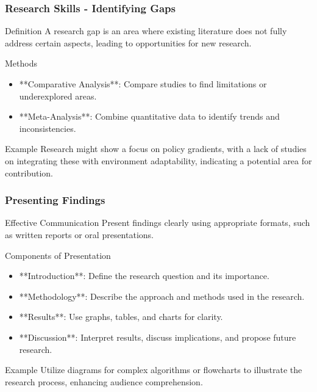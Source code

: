 \documentclass[aspectratio=169]{beamer}
\begin{document}
\begin{frame}[fragile]
    \frametitle{Research Skills - Identifying Gaps}
    \begin{block}{Definition}
        A research gap is an area where existing literature does not fully address certain aspects, leading to opportunities for new research.
    \end{block}
    \begin{block}{Methods}
        \begin{itemize}
            \item **Comparative Analysis**: Compare studies to find limitations or underexplored areas.
            \item **Meta-Analysis**: Combine quantitative data to identify trends and inconsistencies.
        \end{itemize}
    \end{block}
    \begin{block}{Example}
        Research might show a focus on policy gradients, with a lack of studies on integrating these with environment adaptability, indicating a potential area for contribution.
    \end{block}
\end{frame}

\begin{frame}[fragile]
    \frametitle{Presenting Findings}
    \begin{block}{Effective Communication}
        Present findings clearly using appropriate formats, such as written reports or oral presentations.
    \end{block}
    \begin{block}{Components of Presentation}
        \begin{itemize}
            \item **Introduction**: Define the research question and its importance.
            \item **Methodology**: Describe the approach and methods used in the research.
            \item **Results**: Use graphs, tables, and charts for clarity.
            \item **Discussion**: Interpret results, discuss implications, and propose future research.
        \end{itemize}
    \end{block}
    \begin{block}{Example}
        Utilize diagrams for complex algorithms or flowcharts to illustrate the research process, enhancing audience comprehension.
    \end{block}
\end{frame}
\end{document}
